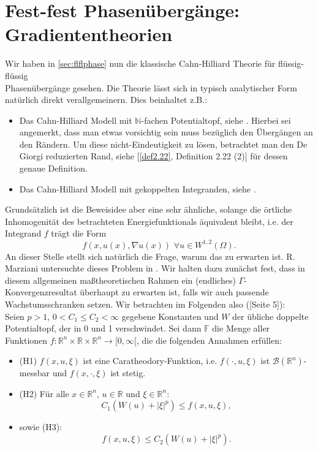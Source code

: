 \section{Fest-fest Phasenübergänge: Gradiententheorien}{\label{sec:solsolphase}}
Wir haben in \ref{sec:flflphase} nun die klassische Cahn-Hilliard Theorie für flüssig-flüssig \\Phasenübergänge gesehen. Die Theorie lässt sich in typisch analytischer Form natürlich direkt verallgemeinern. Dies beinhaltet z.B.:
\begin{itemize}
    \item Das Cahn-Hilliard Modell mit \(\mathbb{N}\)-fachen Potentialtopf, siehe \cite{baldo1990minimal}. Hierbei sei angemerkt, dass man etwas vorsichtig sein muss bezüglich den Übergängen an den Rändern. Um diese nicht-Eindeutigkeit zu lösen, betrachtet man den De Giorgi reduzierten Rand, siehe [\ref{def2.22}, Definition 2.22 (2)] für dessen genaue Definition.
    \item Das Cahn-Hilliard Modell mit gekoppelten Integranden, siehe \cite{owen1991nonconvex}.
\end{itemize}
Grundsätzlich ist die Beweisidee aber eine sehr ähnliche, solange die örtliche Inhomogenität des betrachteten Energiefunktionals äquivalent bleibt, i.e. der Integrand \(f\) trägt die Form
\begin{equation}
    f(x,u(x),\nabla u(x)) \, \, \forall u \in W^{1,2}(\Omega).
\end{equation}
An dieser Stelle stellt sich natürlich die Frage, warum das zu erwarten ist. R. Marziani untersuchte dieses Problem in \cite{Mar22}. Wir halten dazu zunächst fest, dass in diesem allgemeinen maßtheoretischen Rahmen ein (endliches) \(\Gamma\)-Konvergenzresultat überhaupt zu erwarten ist, falls wir auch passende Wachstumsschranken setzen. Wir betrachten im Folgenden also (\cite{Mar22}[Seite 5]):\\
Seien \(p > 1\), \(0 < C_1 \leq C_2 < \infty\) gegebene Konstanten und \(W\) der übliche doppelte Potentialtopf, der in 0 und 1 verschwindet. Sei dann \(\mathbb{F}\) die Menge aller Funktionen \(f : \mathbb{R}^n \times \mathbb{R} \times \mathbb{R}^n \to [0,\infty[\), die die folgenden Annahmen erfüllen:
\begin{itemize}
    \item (H1) \(f(x,u,\xi)\) ist eine Caratheodory-Funktion, i.e. \(f(\cdot,u,\xi)\) ist \(\mathcal{B}(\mathbb{R}^n)\)-messbar und \(f(x,\cdot,\xi)\) ist stetig.
    \item (H2) Für alle \(x \in \mathbb{R}^n\), \(u \in \mathbb{R}\) und \(\xi \in \mathbb{R}^n\):
    \begin{equation}
        C_1(W(u) + |\xi|^p) \leq f(x,u,\xi),
    \end{equation}
    \item sowie (H3):
    \begin{equation}
        f(x,u,\xi) \leq C_2(W(u) + |\xi|^p).
    \end{equation}
\end{itemize}
